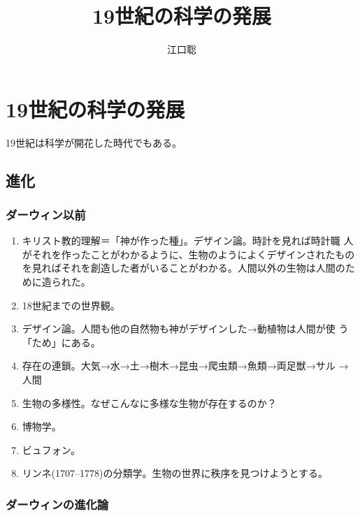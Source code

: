 \documentclass[uplatex,dvipdfmx]{jsarticle}
\author{江口聡}
\title{19世紀の科学の発展}
\begin{document}
\maketitle
\else\chapter{19世紀の科学の発展}\fi



\label{cha:19}

19世紀は科学が開花した時代でもある。



\section{進化}



\subsection{ダーウィン以前}




\begin{enumerate}
 \item キリスト教的理解＝「神が作った種」。デザイン論。時計を見れば時計職
       人がそれを作ったことがわかるように、生物のようによくデザインされたものを見ればそれを創造した者がいることがわかる。人間以外の生物は人間のために造られた。

\item 18世紀までの世界観。
\item デザイン論。人間も他の自然物も神がデザインした→動植物は人間が使
  う「ため」にある。
\item 存在の連鎖。大気→水→土→樹木→昆虫→爬虫類→魚類→両足獣→サル
  →人間
\item 生物の多様性。なぜこんなに多様な生物が存在するのか？
\item 博物学。
\item ビュフォン。
\item リンネ(1707--1778)の分類学。生物の世界に秩序を見つけようとする。


\end{enumerate}



\subsection{ダーウィンの進化論}
\end{document}
